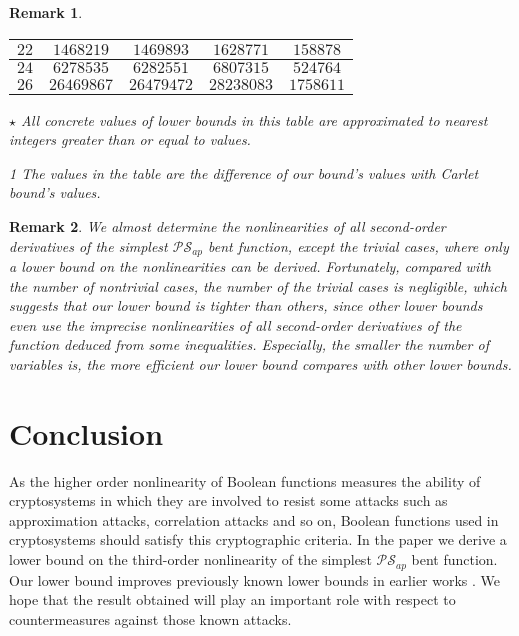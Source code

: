 \documentclass{article}
\newcommand{\0}{\textbf{0}}
\newcommand{\1}{\textbf{1}}
\theoremstyle{plain}
\newtheorem{remark}{Remark}
\begin{document}
\begin{remark}
\begin{table}
\begin{threeparttable}
\begin{tabular}{|c|c|c|c|c|}
                    $22 $ &  $ 1468219     $       & $ 1469893  $     & $ 1628771  $     & $  158878  $ \\  \hline
                    $24 $ &  $ 6278535     $       & $ 6282551  $     & $ 6807315  $     & $  524764  $ \\  \hline
                    $26 $ &  $ 26469867    $       & $ 26479472 $     & $ 28238083 $     & $  1758611 $ \\  \hline
                \end{tabular}
                \begin{tablenotes}
                    \footnotesize
                    \item[$\star$] All concrete values of lower bounds in this table are approximated to nearest  integers greater than or equal to values. 
                    \item[1] The values in the table are the difference of our bound's values with  Carlet bound's values.
                \end{tablenotes}
            \end{threeparttable}
            \label{table:MyTableLabel}
        \end{table}
    \end{remark}

    \begin{remark}
        We almost determine the nonlinearities of all second-order derivatives of the simplest $\mathcal{PS}_{ap}$ bent function, except the trivial cases, where only a lower bound on the nonlinearities can be derived. 
        Fortunately, compared with the number of nontrivial cases, the number of the trivial cases is negligible, 
        which suggests that our lower bound is tighter than others, since other lower bounds even use the imprecise nonlinearities of all second-order derivatives of the function deduced from some inequalities. 
        Especially, the smaller the number of variables is, the more efficient our lower bound compares with other lower bounds. 
    \end{remark}
\section{Conclusion}
    As the higher order nonlinearity of Boolean functions measures the ability of cryptosystems in which they are involved to resist some attacks such as approximation attacks, correlation attacks and so on, Boolean functions used in cryptosystems should satisfy this cryptographic criteria.
    In the paper we derive a lower bound on the third-order nonlinearity of the simplest $\mathcal{PS}_{ap}$ bent function.
    Our lower bound improves previously known lower bounds in earlier works \cite{TangCT2013NL_2bent,Carlet2011NL_Profile_Dillon}.
    We hope that the result obtained will play an important role with respect to countermeasures against those known attacks. 



\end{document}
